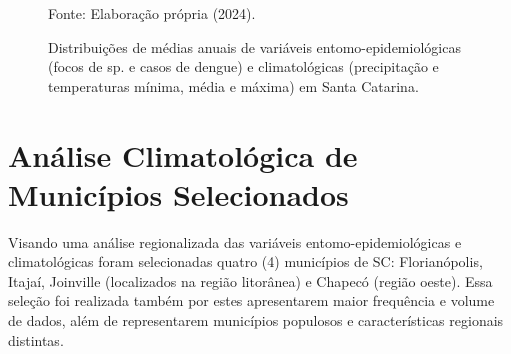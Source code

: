 \begin{landscape}
\begin{figure}[htbp]
    \begin{center}
    \caption{Distribuições de médias anuais de variáveis entomo-epidemiológicas (focos de  sp. e casos de dengue) e climatológicas (precipitação e temperaturas mínima, média e máxima) em Santa Catarina.}
    \label{fig: distribuicao_sazonal_SC_total}
    \hfill
    \hfill
    \end{center}
    \small{Fonte: Elaboração própria (2024).}
\end{figure}
\end{landscape}

\section{Análise Climatológica de Municípios Selecionados} \label{sazonal}

\indent Visando uma análise regionalizada das variáveis entomo-epidemiológicas e climatológicas foram selecionadas  quatro (4) municípios de \acrlong{SC}: Florianópolis, Itajaí, Joinville (localizados na região litorânea) e Chapecó (região oeste). Essa seleção foi realizada também por estes apresentarem maior frequência e volume de dados, além de representarem municípios populosos e características regionais distintas.


